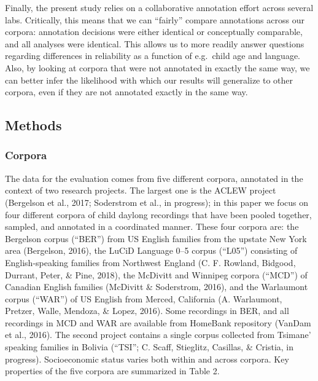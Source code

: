 \documentclass[english,floatsintext,man]{apa6}
\begin{document}
Finally, the present study relies on a collaborative annotation effort
across several labs. Critically, this means that we can \enquote{fairly}
compare annotations across our corpora: annotation decisions were either
identical or conceptually comparable, and all analyses were identical.
This allows us to more readily answer questions regarding differences in
reliability as a function of e.g.~child age and language. Also, by
looking at corpora that were not annotated in exactly the same way, we
can better infer the likelihood with which our results will generalize
to other corpora, even if they are not annotated exactly in the same
way.

\subsection{Methods}\label{methods}

\subsubsection{Corpora}\label{corpora}

The data for the evaluation comes from five different corpora, annotated
in the context of two research projects. The largest one is the ACLEW
project (Bergelson et al., 2017; Soderstrom et al., in progress); in
this paper we focus on four different corpora of child daylong
recordings that have been pooled together, sampled, and annotated in a
coordinated manner. These four corpora are: the Bergelson corpus
(\enquote{BER}) from US English families from the upstate New York area
(Bergelson, 2016), the LuCiD Language 0--5 corpus (\enquote{L05})
consisting of English-speaking families from Northwest England (C. F.
Rowland, Bidgood, Durrant, Peter, \& Pine, 2018), the McDivitt and
Winnipeg corpora (\enquote{MCD}) of Canadian English families (McDivitt
\& Soderstrom, 2016), and the Warlaumont corpus (\enquote{WAR}) of US
English from Merced, California (A. Warlaumont, Pretzer, Walle, Mendoza,
\& Lopez, 2016). Some recordings in BER, and all recordings in MCD and
WAR are available from HomeBank repository (VanDam et al., 2016). The
second project contains a single corpus collected from Tsimane' speaking
families in Bolivia (``TSI''; C. Scaff, Stieglitz, Casillas, \& Cristia,
in progress). Socioeconomic status varies both within and across
corpora. Key properties of the five corpora are summarized in Table 2.
\end{document}
